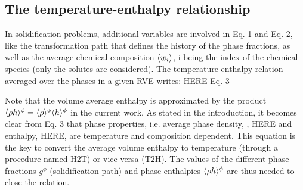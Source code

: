 \subsection{The temperature-enthalpy relationship} 
In solidification problems, additional variables are involved in Eq. 1 and Eq. 2, like the transformation path that defines the history of the phase 
fractions, as well as the average chemical composition $\langle w_i \rangle$, i being the index of the chemical species (only the solutes are considered). The 
temperature-enthalpy relation averaged over the phases in a given RVE writes:
	HERE	Eq. 3
	
Note that the volume average enthalpy is approximated by the product $\langle \rho h \rangle^{\phi}=\langle \rho \rangle^{\phi}\langle h \rangle^{\phi}$ in the current work. As stated in the introduction, it becomes 
clear from Eq. 3 that phase properties, i.e. average phase density, , HERE and enthalpy, HERE, are temperature and composition dependent. This equation 
is the key to convert the average volume enthalpy to temperature (through a procedure named H2T) or vice-versa (T2H). The values of the different phase 
fractions $g^\phi$ (solidification path) and phase enthalpies $\langle \rho h \rangle^{\phi}$ are thus needed to close the relation.


